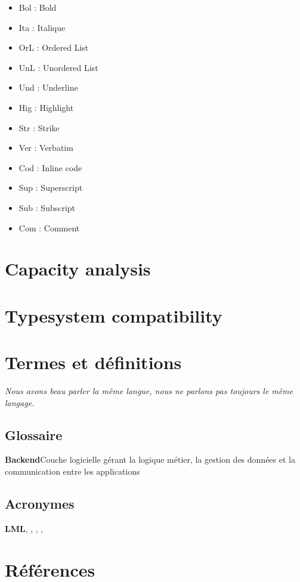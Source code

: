 \documentclass[a4paper,12pt]{article}
\begin{document}
\begin{tablenotes}
\begin{multicols}{3}\small
\begin{itemize}
  \item Bol : Bold
  \item Ita : Italique
  \item OrL : Ordered List
  \item UnL : Unordered List
  \item Und : Underline
  \item Hig : Highlight
  \item Str : Strike
  \item Ver : Verbatim
  \item Cod : Inline code
  \item Sup : Superscript
  \item Sub : Subscript
  \item Com : Comment
\end{itemize}
\end{multicols}
\end{tablenotes}
\section{Capacity analysis}
\label{sec:org123507c}

\section{Typesystem compatibility}
\label{sec:org05f0891}
\section{Termes et définitions}
\label{sec:org2aaceb0}
\emph{Nous avons beau parler la même langue, nous ne parlons pas toujours le même langage.}
\begin{multicols}{3}
\subsection{Glossaire}
\label{sec:org270bb3e}
\textbf{\hypertarget{gls-5}{Backend}}\hspace*{1em}Couche logicielle gérant la logique métier, la gestion des données et la communication entre les applications\hspace*{.5em}\pageref{gls-2-use-1}
\subsection{Acronymes}
\label{sec:orgb16bc22}
\textbf{\hypertarget{gls-348}{LML}}\hspace*{1em}\hspace*{.5em}\pageref{gls-1-use-1}, \pageref{gls-1-use-2}, \pageref{gls-1-use-3}, \pageref{gls-1-use-4}, \pageref{gls-1-use-5}

\end{multicols}
\section{Références}
\label{sec:orga108136}
\printbibliography[heading=none]
\end{document}
